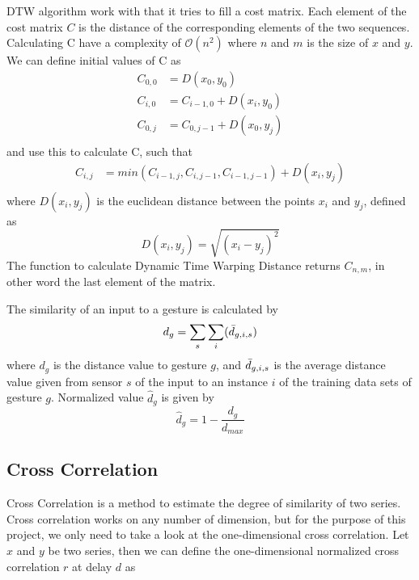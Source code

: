 DTW algorithm work with that it tries to fill a cost matrix. Each element of the cost matrix $C$ is the distance of the corresponding elements of the two sequences. Calculating C have a complexity of $\mathcal{O}(n^2)$ where $n$ and $m$ is the size of $x$ and $y$. We can define initial values of C as
\begin{align*}
    C_{0,0} &= D(x_{0},y_{0})  \\
    C_{i,0} &= C_{i-1,0} + D(x_{i},y_{0}) \\
    C_{0,j} &= C_{0,j-1} + D(x_{0},y_{j}) \\
\end{align*}
 and use this to calculate C, such that
\begin{align*}
    C_{i,j} &= min(C_{i - 1,j}, C_{i,j - 1}, C_{i - 1,j - 1}) + D(x_{i}, y_{j}) \\
\end{align*}
where $D(x_{i},y_{j})$ is the euclidean distance between the points $x_{i}$ and $y_{j}$, defined as
\begin{equation*}
    D(x_{i},y_{j}) = \sqrt{(x_{i}-y_{j})^2}
\end{equation*}
The function to calculate Dynamic Time Warping Distance returns $C_{n,m}$, in other word the last element of the matrix.

The similarity of an input to a gesture is calculated by
\begin{equation*}
    d_{g} = \sum_{s}\sum_{i}(\bar{d}_{g,i,s})
\end{equation*}
where $d_{g}$ is the distance value to gesture $g$, and $\bar{d}_{g,i,s}$ is the average distance value given from sensor $s$ of the input to an instance $i$ of the training data sets of gesture $g$. Normalized value $\hat{d}_{g}$ is given by
\begin{equation*}
    \hat{d}_{g} = 1 - \frac{d_{g}}{d_{max}}
\end{equation*}


\subsection{Cross Correlation}
\label{subsec:cross_correlation}
Cross Correlation is a method to estimate the degree of similarity of two series. Cross correlation works on any number of dimension, but for the purpose of this project, we only need to take a look at the one-dimensional cross correlation. Let $x$ and $y$ be two series, then we can define the one-dimensional normalized cross correlation $r$ at delay $d$ as	

